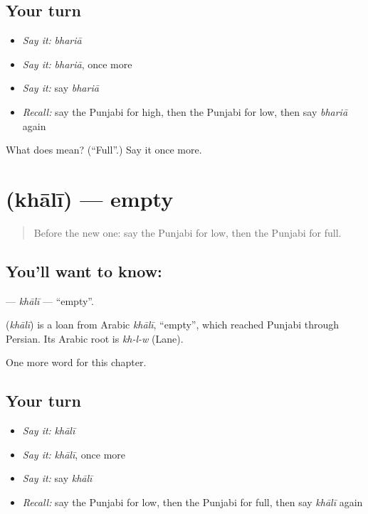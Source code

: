 \subsection*{Your turn}
\begin{itemize}
\raggedright
  \item \emph{Say it:} \emph{bhariā}
  \item \emph{Say it:} \emph{bhariā}, once more
  \item \emph{Say it:} say \emph{bhariā}
  \item \emph{Recall:} say the Punjabi for high, then the Punjabi for low, then say \emph{bhariā} again
\end{itemize}

\begin{tcolorbox}[breakable,colback=teal!4,colframe=teal!35!black,title={Before you move on}]
What does  mean? (\textquotedblleft{}Full\textquotedblright{}.) Say it once more.
\end{tcolorbox}
\section[\texorpdfstring{\pa{ਖ਼ਾਲੀ} (khālī)}{ਖ਼ਾਲੀ (khālī)}]{ (khālī) — empty}

\label{lesson:PA-C82-khali}



\begin{quote}
Before the new one: say the Punjabi for low, then the Punjabi for full.
\end{quote}

\subsection*{You'll want to know: }
\textbf{} — \emph{khālī} — \textquotedblleft{}empty\textquotedblright{}.

\begin{cousinweb}
\textbf{} (\emph{khālī}) is a loan from Arabic \emph{khālī}, \textquotedblleft{}empty\textquotedblright{}, which reached Punjabi through Persian. Its Arabic root is \emph{kh-l-w} (Lane).
\end{cousinweb}

\begin{grammarlens}[title={What you've built}]
One more word for this chapter.
\end{grammarlens}

\subsection*{Your turn}
\begin{itemize}
\raggedright
  \item \emph{Say it:} \emph{khālī}
  \item \emph{Say it:} \emph{khālī}, once more
  \item \emph{Say it:} say \emph{khālī}
  \item \emph{Recall:} say the Punjabi for low, then the Punjabi for full, then say \emph{khālī} again
\end{itemize}


